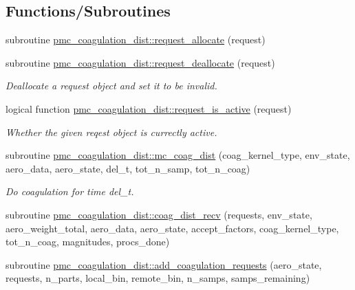 \subsection*{Functions/\+Subroutines}
\begin{DoxyCompactItemize}
\item 
subroutine \mbox{\hyperlink{namespacepmc__coagulation__dist_afb4f993c6a05a78eac5532dc2eea2fca}{pmc\+\_\+coagulation\+\_\+dist\+::request\+\_\+allocate}} (request)
\item 
subroutine \mbox{\hyperlink{namespacepmc__coagulation__dist_a3a30ae518446f11900156387e90adc91}{pmc\+\_\+coagulation\+\_\+dist\+::request\+\_\+deallocate}} (request)
\begin{DoxyCompactList}\small\item\em Deallocate a request object and set it to be invalid. \end{DoxyCompactList}\item 
logical function \mbox{\hyperlink{namespacepmc__coagulation__dist_a2177c5bb512ea9262020b6928f2b5cba}{pmc\+\_\+coagulation\+\_\+dist\+::request\+\_\+is\+\_\+active}} (request)
\begin{DoxyCompactList}\small\item\em Whether the given reqest object is currectly active. \end{DoxyCompactList}\item 
subroutine \mbox{\hyperlink{namespacepmc__coagulation__dist_ae16e2850c2b268d077e91fac1f254660}{pmc\+\_\+coagulation\+\_\+dist\+::mc\+\_\+coag\+\_\+dist}} (coag\+\_\+kernel\+\_\+type, env\+\_\+state, aero\+\_\+data, aero\+\_\+state, del\+\_\+t, tot\+\_\+n\+\_\+samp, tot\+\_\+n\+\_\+coag)
\begin{DoxyCompactList}\small\item\em Do coagulation for time del\+\_\+t. \end{DoxyCompactList}\item 
subroutine \mbox{\hyperlink{namespacepmc__coagulation__dist_aa22e4e811fa31c5cd6049b4f216ac512}{pmc\+\_\+coagulation\+\_\+dist\+::coag\+\_\+dist\+\_\+recv}} (requests, env\+\_\+state, aero\+\_\+weight\+\_\+total, aero\+\_\+data, aero\+\_\+state, accept\+\_\+factors, coag\+\_\+kernel\+\_\+type, tot\+\_\+n\+\_\+coag, magnitudes, procs\+\_\+done)
\item 
subroutine \mbox{\hyperlink{namespacepmc__coagulation__dist_af4c13796261cf2c77fd2209a6d550184}{pmc\+\_\+coagulation\+\_\+dist\+::add\+\_\+coagulation\+\_\+requests}} (aero\+\_\+state, requests, n\+\_\+parts, local\+\_\+bin, remote\+\_\+bin, n\+\_\+samps, samps\+\_\+remaining)

\end{DoxyCompactItemize}
